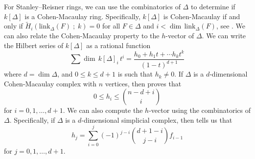 \documentclass[12pt,leqno]{amsart}
\theoremstyle{definition}
\begin{document}

For Stanley--Reisner rings, we can use the combinatorics of $\Delta$ to
determine if $k[\Delta]$ is a Cohen-Macaulay ring. Specifically, $k[\Delta]$
is Cohen-Macaulay if and only if
$\widetilde H_i(\mathrm{link}_\Delta(F)\; ;\;k) = 0$ for all $F \in \Delta$
and $i < \dim \hspace{2pt} \mathrm{link}_\Delta(F)$, see \cite[Corollary
5.3.9]{BH}. We can also relate the Cohen-Macaulay property to the $h$-vector
of $\Delta$. We can write the Hilbert series of $k[\Delta]$ as a rational
function
%
\[
  \sum \dim \hspace{2pt} k[\Delta]_i \hspace{2pt} t^i = \frac {h_0 + h_1t +
    \cdots h_k t^k}{(1-t)^{d+1}}
\]
%
where $d = \dim \Delta$, and $0 \leq k \leq d+1$ is such that $h_k \not =
0$. If $\Delta$ is a $d$-dimensional Cohen-Macaulay complex with $n$ vertices,
then \cite[Lemma 5.1.10]{BH} proves that
%
\[
  0 \leq h_i \leq \binom{n-d+i}{i}
\]
%
for $i = 0,1,\dotsc,d+1$. We can also compute the $h$-vector using the
combinatorics of $\Delta$. Specifically, if $\Delta$ is a $d$-dimensional
simplicial complex, then \cite[Lemma 5.1.8]{BH} tells us that
%
\[
  h_j = \sum_{i=0}^j (-1)^{j-i} \binom{d+1-i}{j-i}f_{i-1}
\]
%
for $j = 0,1,\dotsc,d+1$.
%
\end{document}
